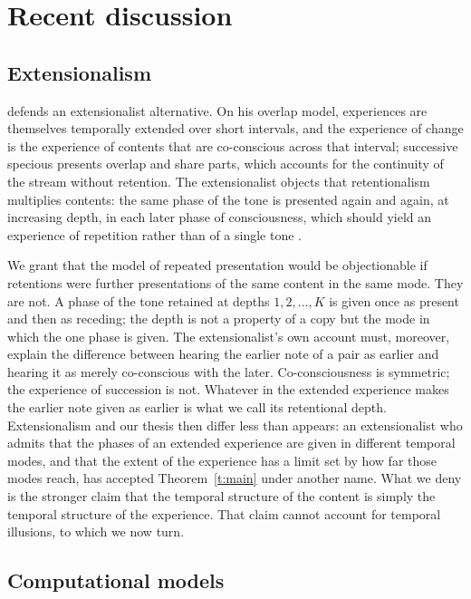 \documentclass{situationist-preprint}
\begin{document}
\section{Recent discussion}\label{s:recent}

\subsection{Extensionalism}

\citet{Dainton2000} defends an extensionalist alternative. On his overlap model, experiences are themselves temporally extended over short intervals, and the experience of change is the experience of contents that are co-conscious across that interval; successive specious presents overlap and share parts, which accounts for the continuity of the stream without retention. The extensionalist objects that retentionalism multiplies contents: the same phase of the tone is presented again and again, at increasing depth, in each later phase of consciousness, which should yield an experience of repetition rather than of a single tone \citep{Dainton2000}.

We grant that the model of repeated presentation would be objectionable if retentions were further presentations of the same content in the same mode. They are not. A phase of the tone retained at depths $1,2,\dots,K$ is given once as present and then as receding; the depth is not a property of a copy but the mode in which the one phase is given. The extensionalist's own account must, moreover, explain the difference between hearing the earlier note of a pair as earlier and hearing it as merely co-conscious with the later. Co-consciousness is symmetric; the experience of succession is not. Whatever in the extended experience makes the earlier note given as earlier is what we call its retentional depth. Extensionalism and our thesis then differ less than appears: an extensionalist who admits that the phases of an extended experience are given in different temporal modes, and that the extent of the experience has a limit set by how far those modes reach, has accepted Theorem~\ref{t:main} under another name. What we deny is the stronger claim that the temporal structure of the content is simply the temporal structure of the experience. That claim cannot account for temporal illusions, to which we now turn.

\subsection{Computational models}
\end{document}

